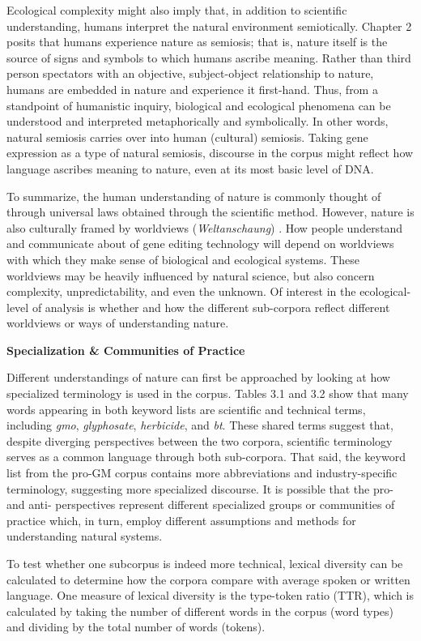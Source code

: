 Ecological complexity might also imply that, in addition to scientific understanding, humans interpret the natural environment semiotically. Chapter 2 posits that humans experience nature as semiosis; that is, nature itself is the source of signs and symbols to which humans ascribe meaning. Rather than third person spectators with an objective, subject-object relationship to nature, humans are embedded in nature and experience it first-hand. Thus, from a standpoint of humanistic inquiry, biological and ecological phenomena can be understood and interpreted metaphorically and symbolically. In other words, natural semiosis carries over into human (cultural) semiosis. Taking gene expression as a type of natural semiosis, discourse in the corpus might reflect how language ascribes meaning to nature, even at its most basic level of DNA. 

To summarize, the human understanding of nature is commonly thought of through universal laws obtained through the scientific method. However, nature is also culturally framed by worldviews (\textit{Weltanschaung}) \citep[217-228]{Dahl2016}. How people understand and communicate about of gene editing technology will depend on worldviews with which they make sense of biological and ecological systems. These worldviews may be heavily influenced by natural science, but also concern complexity, unpredictability, and even the unknown. Of interest in the ecological-level of analysis is whether and how the different sub-corpora reflect different worldviews or ways of understanding nature. 

\textbf{Specialization \& Communities of Practice}

Different understandings of nature can first be approached by looking at how specialized terminology is used in the corpus. Tables 3.1 and 3.2 show that many words appearing in both keyword lists are scientific and technical terms, including \textit{gmo}, \textit{glyphosate}, \textit{herbicide}, and \textit{bt}. These shared terms suggest that, despite diverging perspectives between the two corpora, scientific terminology serves as a common language through both sub-corpora. That said, the keyword list from the pro-GM corpus contains more abbreviations and industry-specific terminology, suggesting more specialized discourse. It is possible that the pro- and anti- perspectives represent different specialized groups or communities of practice which, in turn, employ different assumptions and methods for understanding natural systems.  

To test whether one subcorpus is indeed more technical, lexical diversity can be calculated to determine how the corpora compare with average spoken or written language. One measure of lexical diversity is the type-token ratio (TTR), which is calculated by taking the number of different words in the corpus (word types) and dividing by the total number of words (tokens).

